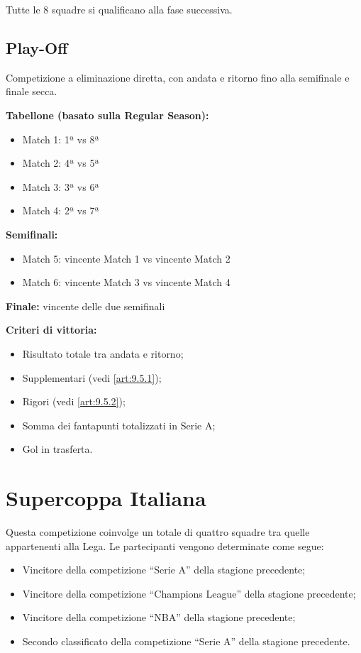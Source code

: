 Tutte le 8 squadre si qualificano alla fase successiva.

\subsection{Play-Off}
\label{art:9.3.2}

Competizione a eliminazione diretta, con andata e ritorno fino alla semifinale e finale secca.

\textbf{Tabellone (basato sulla Regular Season):}
\begin{itemize}
    \item Match 1: 1ª vs 8ª
    \item Match 2: 4ª vs 5ª
    \item Match 3: 3ª vs 6ª
    \item Match 4: 2ª vs 7ª
\end{itemize}

\textbf{Semifinali:} 
\begin{itemize}
    \item Match 5: vincente Match 1 vs vincente Match 2
    \item Match 6: vincente Match 3 vs vincente Match 4
\end{itemize}
\textbf{Finale:} vincente delle due semifinali

\textbf{Criteri di vittoria:}
\begin{itemize}
\item Risultato totale tra andata e ritorno;
\item Supplementari (vedi \ref{art:9.5.1});
\item Rigori (vedi \ref{art:9.5.2});
\item Somma dei fantapunti totalizzati in Serie A;
\item Gol in trasferta.
\end{itemize}

\section{Supercoppa Italiana}
\label{art:9.4}
Questa competizione coinvolge un totale di quattro squadre tra quelle appartenenti alla Lega. Le partecipanti vengono determinate come segue:

\begin{itemize}
    \item Vincitore della competizione “Serie A” della stagione precedente;
    \item Vincitore della competizione “Champions League” della stagione precedente;
    \item Vincitore della competizione “NBA” della stagione precedente;
    \item Secondo classificato della competizione “Serie A” della stagione precedente.
\end{itemize}

